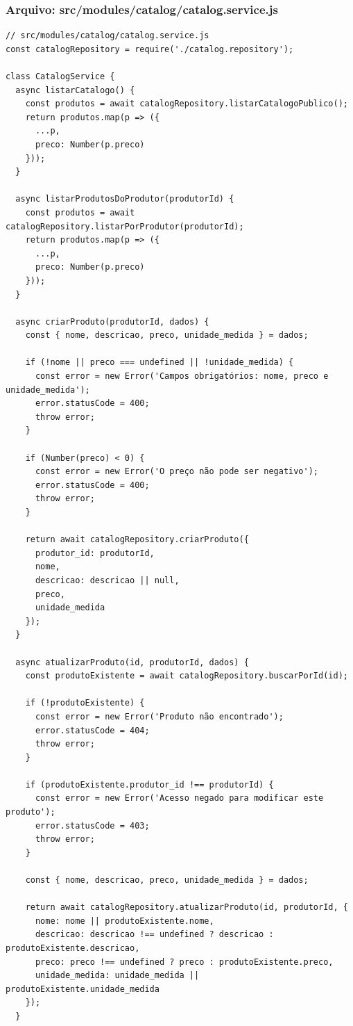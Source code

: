 \subsubsection*{Arquivo: src/modules/catalog/catalog.service.js}
\begin{lstlisting}[caption={src/modules/catalog/catalog.service.js}]
// src/modules/catalog/catalog.service.js
const catalogRepository = require('./catalog.repository');

class CatalogService {
  async listarCatalogo() {
    const produtos = await catalogRepository.listarCatalogoPublico();
    return produtos.map(p => ({
      ...p,
      preco: Number(p.preco)
    }));
  }

  async listarProdutosDoProdutor(produtorId) {
    const produtos = await catalogRepository.listarPorProdutor(produtorId);
    return produtos.map(p => ({
      ...p,
      preco: Number(p.preco)
    }));
  }

  async criarProduto(produtorId, dados) {
    const { nome, descricao, preco, unidade_medida } = dados;

    if (!nome || preco === undefined || !unidade_medida) {
      const error = new Error('Campos obrigatórios: nome, preco e unidade_medida');
      error.statusCode = 400;
      throw error;
    }

    if (Number(preco) < 0) {
      const error = new Error('O preço não pode ser negativo');
      error.statusCode = 400;
      throw error;
    }

    return await catalogRepository.criarProduto({
      produtor_id: produtorId,
      nome,
      descricao: descricao || null,
      preco,
      unidade_medida
    });
  }

  async atualizarProduto(id, produtorId, dados) {
    const produtoExistente = await catalogRepository.buscarPorId(id);
    
    if (!produtoExistente) {
      const error = new Error('Produto não encontrado');
      error.statusCode = 404;
      throw error;
    }

    if (produtoExistente.produtor_id !== produtorId) {
      const error = new Error('Acesso negado para modificar este produto');
      error.statusCode = 403;
      throw error;
    }

    const { nome, descricao, preco, unidade_medida } = dados;

    return await catalogRepository.atualizarProduto(id, produtorId, {
      nome: nome || produtoExistente.nome,
      descricao: descricao !== undefined ? descricao : produtoExistente.descricao,
      preco: preco !== undefined ? preco : produtoExistente.preco,
      unidade_medida: unidade_medida || produtoExistente.unidade_medida
    });
  }


\end{lstlisting}
